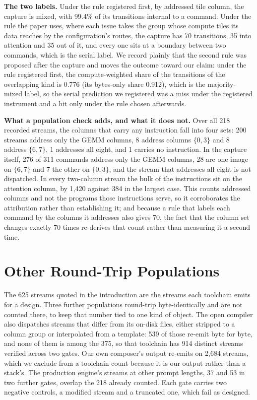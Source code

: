 \documentclass{article}
\begin{document}
\textbf{The two labels.} Under the rule registered first, by addressed tile column, the capture is mixed, with 99.4\%
of its transitions internal to a command. Under the rule the paper uses, where each issue takes the group whose compute
tiles its data reaches by the configuration's routes, the capture has 70 transitions, 35 into attention and 35 out of it,
and every one sits at a boundary between two commands, which is the serial label. We record plainly that the second
rule was proposed after the capture and moves the outcome toward our claim: under the rule registered first, the
compute-weighted share of the transitions of the overlapping kind is 0.776 (its bytes-only share 0.912), which is the
majority-mixed label, so the serial prediction we registered was a miss under the registered instrument and a hit
only under the rule chosen afterwards.

\textbf{What a population check adds, and what it does not.} Over all 218 recorded streams, the columns that carry any
instruction fall into four sets: 200 streams address only the GEMM columns, 8 address columns $\{0,3\}$ and 8 address
$\{6,7\}$, 1 addresses all eight, and 1 carries no instruction. In the capture itself, 276 of 311 commands address only
the GEMM columns, 28 are one image on $\{6,7\}$ and 7 the other on $\{0,3\}$, and the stream that addresses all eight
is not dispatched. In every two-column stream the bulk of the instructions sit on the attention column, by 1{,}420
against 384 in the largest case. This counts addressed columns and not the programs those instructions serve, so it
corroborates the attribution rather than establishing it; and because a rule that labels each command by the
columns it addresses also gives 70, the fact that the column set changes exactly 70 times re-derives that count
rather than measuring it a second time.

\section{Other Round-Trip Populations}
\label{app:roundtrip}

The 625 streams quoted in the introduction are the streams each toolchain emits for a design. Three further
populations round-trip byte-identically and are not counted there, to keep that number tied to one kind of object.
The open compiler also dispatches streams that differ from its on-disk files, either stripped to a column group or
interpolated from a template: 539 of those re-emit byte for byte, and none of them is among the 375, so that toolchain
has 914 distinct streams verified across two gates. Our own composer's output re-emits on 2{,}684 streams, which we
exclude from a toolchain count because it is our output rather than a stack's. The production engine's streams at
other prompt lengths, 37 and 53 in two further gates, overlap the 218 already counted. Each gate carries two negative
controls, a modified stream and a truncated one, which fail as designed.
\end{document}
